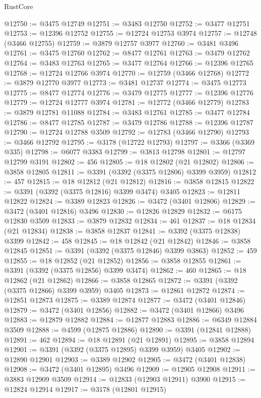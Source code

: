 \begin{lexlean}{RustCore}
\begin{coremodule}
@12750 := @3475 @12749
@12751 := @3483 @12750
@12752 := @3477 @12751
@12753 := @12396 @12752
@12755 := @12724 @12753 @3974
@12757 := @12748 (@3466 @12755)
@12759 := @3879 @12757 @3977
@12760 := @3481 @3496
@12761 := @3475 @12760
@12762 := @8477 @12761
@12763 := @3479 @12762
@12764 := @3483 @12763
@12765 := @3477 @12764
@12766 := @12396 @12765
@12768 := @12724 @12766 @3974
@12770 := @12759 (@3466 @12768)
@12772 := @3879 @12770 @3977
@12773 := @3481 @12737
@12774 := @3475 @12773
@12775 := @8477 @12774
@12776 := @3479 @12775
@12777 := @12396 @12776
@12779 := @12724 @12777 @3974
@12781 := @12772 (@3466 @12779)
@12783 := @3879 @12781 @11088
@12784 := @3483 @12761
@12785 := @3477 @12784
@12786 := @8477 @12785
@12787 := @3479 @12786
@12788 := @12396 @12787
@12790 := @12724 @12788 @3509
@12792 := @12783 (@3466 @12790)
@12793 := @3466 @12792
@12795 := @3178 (@12722 @12793)
@12797 := @3366 (@3369 @335)
@12798 := @6077 @3383
@12799 := @3813 @12798
@12801 := @12797 @12799 @3191
@12802 := 456
@12805 := @18 @12802 (@21 @12802)
@12806 := @3858 @12805
@12811 := @3391 (@3392 (@3375 @12806) @3399 @3959)
@12812 := 457
@12815 := @18 @12812 (@21 @12812)
@12816 := @3858 @12815
@12822 := @3391 (@3392 (@3375 @12816) @3399 @3474) @3405
@12823 := @12811 @12822
@12824 := @3389 @12823
@12826 := @3472 (@3401 @12806)
@12829 := @3472 (@3401 @12816) @3496
@12830 := @12826 @12829
@12832 := @6175 @12830 @3509
@12833 := @3879 @12832
@12834 := 461
@12837 := @18 @12834 (@21 @12834)
@12838 := @3858 @12837
@12841 := @3392 (@3375 @12838) @3399
@12842 := 458
@12845 := @18 @12842 (@21 @12842)
@12846 := @3858 @12845
@12851 := @3391 (@3392 (@3375 @12846) @3399 @3863)
@12852 := 459
@12855 := @18 @12852 (@21 @12852)
@12856 := @3858 @12855
@12861 := @3391 (@3392 (@3375 @12856) @3399 @3474)
@12862 := 460
@12865 := @18 @12862 (@21 @12862)
@12866 := @3858 @12865
@12872 := @3391 (@3392 (@3375 @12866) @3399 @3959) @3405
@12873 := @12861 @12872
@12874 := @12851 @12873
@12875 := @3389 @12874
@12877 := @3472 (@3401 @12846)
@12879 := @3472 (@3401 @12856)
@12882 := @3472 (@3401 @12866) @3496
@12883 := @12879 @12882
@12884 := @12877 @12883
@12886 := @6349 @12884 @3509
@12888 := @4599 (@12875 @12886)
@12890 := @3391 (@12841 @12888)
@12891 := 462
@12894 := @18 @12891 (@21 @12891)
@12895 := @3858 @12894
@12901 := @3391 (@3392 (@3375 @12895) @3399 @3959) @3405
@12902 := @12890 @12901
@12903 := @3389 @12902
@12905 := @3472 (@3401 @12838)
@12908 := @3472 (@3401 @12895) @3496
@12909 := @12905 @12908
@12911 := @3883 @12909 @3509
@12914 := @12833 (@12903 @12911) @3900
@12915 := @12824 @12914
@12917 := @3178 (@12801 @12915)

\end{coremodule}
\end{lexlean}
